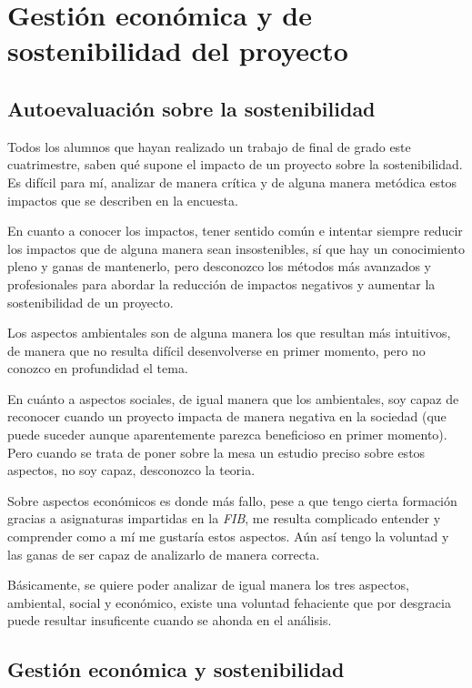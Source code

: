 \section{Gestión económica y de sostenibilidad del proyecto}
\label{sec:sostenibilidad}
\subsection{Autoevaluación sobre la sostenibilidad}

Todos los alumnos que hayan realizado un trabajo de final de grado este cuatrimestre, saben qué supone el impacto de un proyecto sobre la sostenibilidad. Es difícil para mí, analizar de manera crítica y de alguna manera metódica estos impactos que se describen en la encuesta. 
\par\medskip
En cuanto a conocer los impactos, tener sentido común e intentar siempre reducir los impactos que de alguna manera sean insostenibles, sí que hay un conocimiento pleno y ganas de mantenerlo, pero desconozco los métodos más avanzados y profesionales para abordar la reducción de impactos negativos y aumentar la sostenibilidad de un proyecto.
\par\medskip
Los aspectos ambientales son de alguna manera los que resultan más intuitivos, de manera que no resulta difícil desenvolverse en primer momento, pero no conozco en profundidad el tema.
\par\medskip
En cuánto a aspectos sociales, de igual manera que los ambientales, soy capaz de reconocer cuando un proyecto impacta de manera negativa en la sociedad (que puede suceder aunque aparentemente parezca beneficioso en primer momento). Pero cuando se trata de poner sobre la mesa un estudio preciso sobre estos aspectos, no soy capaz, desconozco la teoria.
\par\medskip
Sobre aspectos económicos es donde más fallo, pese a que tengo cierta formación gracias a asignaturas impartidas en la \textit{FIB}, me resulta complicado entender y comprender como a mí me gustaría estos aspectos. Aún así tengo la voluntad y las ganas de ser capaz de analizarlo de manera correcta.
\par\medskip
Básicamente, se quiere poder analizar de igual manera los tres aspectos, ambiental, social y económico, existe una voluntad fehaciente que por desgracia puede resultar insuficente cuando se ahonda en el análisis.

\subsection{Gestión económica y sostenibilidad}

